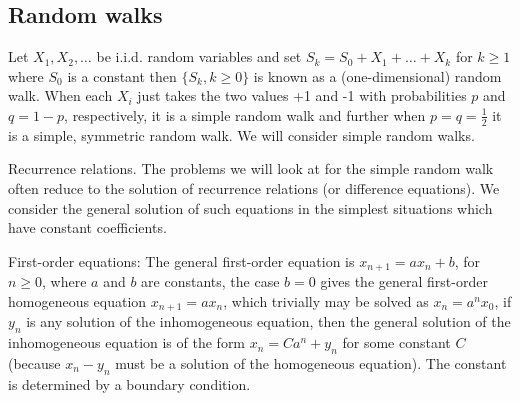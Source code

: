 

\subsection{Random walks}

\begin{definition}
Let $X_1,X_2,\dots$ be i.i.d. random variables and set $S_k = S_0 + X_1 + \dots + X_k$ for $k \geq 1$ where $S_0$ is a constant then $\{S_k, k \geq 0\}$ is known as a (one-dimensional) random walk. When each $X_i$ just takes the two values +1 and -1 with probabilities $p$ and $q = 1 - p$, respectively, it is a simple random walk and further when $p = q = \frac 12$ it is a simple, symmetric random walk. We will consider simple random walks.
\end{definition}

Recurrence relations. The problems we will look at for the simple random walk often reduce to the solution of recurrence relations (or difference equations). We consider the general solution of such equations in the simplest situations which have constant coefficients.
\ben
\item [1.] First-order equations: The general first-order equation is $x_{n+1} = ax_n + b$, for $n \geq 0$, where $a$ and $b$ are constants, the case $b = 0$ gives the general first-order homogeneous equation $x_{n+1} = ax_n$, which trivially may be solved as $x_n = a^nx_0$, if $y_n$ is any solution of the inhomogeneous equation, then the general solution of the inhomogeneous equation is of the form $x_n = Ca^n + y_n$ for some constant $C$ (because $x_n-y_n$ must be a solution of the homogeneous equation). The constant is determined by a boundary condition.


